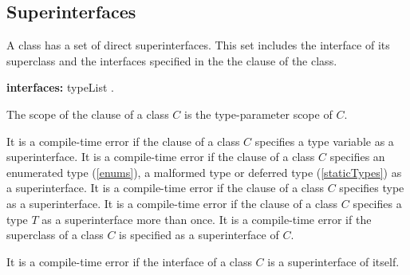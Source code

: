 \documentclass{article}
\begin{document}

\subsection{ Superinterfaces}

\LMHash{}
A class has a set of direct superinterfaces. This set includes the interface of its superclass and the interfaces specified in the the \IMPLEMENTS{}  clause of the class.

\begin{grammar}
{\bf interfaces:}
      \IMPLEMENTS{} typeList
    .
\end{grammar}

\LMHash{}
The scope of the \IMPLEMENTS{} clause of a class $C$ is the type-parameter scope of $C$.

\LMHash{}
It is a compile-time error if  the \IMPLEMENTS{}  clause of a class $C$ specifies a type variable as a superinterface. It is a compile-time error if  the  \IMPLEMENTS{} clause of a class $C$ specifies an enumerated type (\ref{enums}),  a malformed type or deferred type (\ref{staticTypes}) as a superinterface.  It is a compile-time error if the \IMPLEMENTS{} clause of a class $C$ specifies type \DYNAMIC{} as a superinterface. It is a compile-time error if  the  \IMPLEMENTS{} clause of a class $C$ specifies  a type $T$ as a superinterface more than once.
It is a compile-time error if the superclass of a class $C$ is specified as a superinterface of $C$.


\LMHash{}
It is a compile-time error if the interface of a class $C$ is a superinterface of itself.
\end{document}
